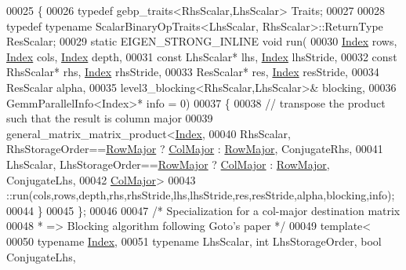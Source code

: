 \begin{DoxyCode}
00025 \{
00026   \textcolor{keyword}{typedef} gebp\_traits<RhsScalar,LhsScalar> Traits;
00027 
00028   \textcolor{keyword}{typedef} \textcolor{keyword}{typename} ScalarBinaryOpTraits<LhsScalar, RhsScalar>::ReturnType ResScalar;
00029   \textcolor{keyword}{static} EIGEN\_STRONG\_INLINE \textcolor{keywordtype}{void} run(
00030     \hyperlink{namespace_eigen_a62e77e0933482dafde8fe197d9a2cfde}{Index} rows, \hyperlink{namespace_eigen_a62e77e0933482dafde8fe197d9a2cfde}{Index} cols, \hyperlink{namespace_eigen_a62e77e0933482dafde8fe197d9a2cfde}{Index} depth,
00031     \textcolor{keyword}{const} LhsScalar* lhs, \hyperlink{namespace_eigen_a62e77e0933482dafde8fe197d9a2cfde}{Index} lhsStride,
00032     \textcolor{keyword}{const} RhsScalar* rhs, \hyperlink{namespace_eigen_a62e77e0933482dafde8fe197d9a2cfde}{Index} rhsStride,
00033     ResScalar* res, \hyperlink{namespace_eigen_a62e77e0933482dafde8fe197d9a2cfde}{Index} resStride,
00034     ResScalar alpha,
00035     level3\_blocking<RhsScalar,LhsScalar>& blocking,
00036     GemmParallelInfo<Index>* info = 0)
00037   \{
00038     \textcolor{comment}{// transpose the product such that the result is column major}
00039     general\_matrix\_matrix\_product<\hyperlink{namespace_eigen_a62e77e0933482dafde8fe197d9a2cfde}{Index},
00040       RhsScalar, RhsStorageOrder==\hyperlink{group__enums_ggaacded1a18ae58b0f554751f6cdf9eb13acfcde9cd8677c5f7caf6bd603666aae3}{RowMajor} ? \hyperlink{group__enums_ggaacded1a18ae58b0f554751f6cdf9eb13a0cbd4bdd0abcfc0224c5fcb5e4f6669a}{ColMajor} : \hyperlink{group__enums_ggaacded1a18ae58b0f554751f6cdf9eb13acfcde9cd8677c5f7caf6bd603666aae3}{RowMajor}, ConjugateRhs,
00041       LhsScalar, LhsStorageOrder==\hyperlink{group__enums_ggaacded1a18ae58b0f554751f6cdf9eb13acfcde9cd8677c5f7caf6bd603666aae3}{RowMajor} ? \hyperlink{group__enums_ggaacded1a18ae58b0f554751f6cdf9eb13a0cbd4bdd0abcfc0224c5fcb5e4f6669a}{ColMajor} : \hyperlink{group__enums_ggaacded1a18ae58b0f554751f6cdf9eb13acfcde9cd8677c5f7caf6bd603666aae3}{RowMajor}, ConjugateLhs,
00042       \hyperlink{group__enums_ggaacded1a18ae58b0f554751f6cdf9eb13a0cbd4bdd0abcfc0224c5fcb5e4f6669a}{ColMajor}>
00043     ::run(cols,rows,depth,rhs,rhsStride,lhs,lhsStride,res,resStride,alpha,blocking,info);
00044   \}
00045 \};
00046 
00047 \textcolor{comment}{/*  Specialization for a col-major destination matrix}
00048 \textcolor{comment}{ *    => Blocking algorithm following Goto's paper */}
00049 \textcolor{keyword}{template}<
00050   \textcolor{keyword}{typename} \hyperlink{namespace_eigen_a62e77e0933482dafde8fe197d9a2cfde}{Index},
00051   \textcolor{keyword}{typename} LhsScalar, \textcolor{keywordtype}{int} LhsStorageOrder, \textcolor{keywordtype}{bool} ConjugateLhs,

\end{DoxyCode}
